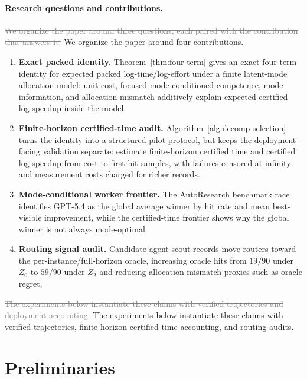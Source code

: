 \documentclass{article}
\newcommand{\oldtext}[1]{\textcolor{gray}{\sout{#1}}}
\newcommand{\newtext}[1]{\textcolor{green!50!black}{#1}}
\begin{document}
\paragraph{Research questions and contributions.}
\oldtext{We organize the paper around three questions, each paired with the contribution that answers it.}
\newtext{We organize the paper around four contributions.}

\begin{enumerate}[leftmargin=1.4em,itemsep=0.15em]
\item \newtext{\textbf{Exact packed identity.}
Theorem~\ref{thm:four-term} gives an exact four-term identity for expected packed log-time/log-effort under a finite latent-mode allocation model: unit cost, focused mode-conditioned competence, mode information, and allocation mismatch additively explain expected certified log-speedup inside the model.}
\item \newtext{\textbf{Finite-horizon certified-time audit.}
Algorithm~\ref{alg:decomp-selection} turns the identity into a structured pilot protocol, but keeps the deployment-facing validation separate: estimate finite-horizon certified time and certified log-speedup from cost-to-first-hit samples, with failures censored at infinity and measurement costs charged for richer records.}
\item \newtext{\textbf{Mode-conditional worker frontier.}
The AutoResearch benchmark race identifies GPT-5.4 as the global average winner by hit rate and mean best-visible improvement, while the certified-time frontier shows why the global winner is not always mode-optimal.}
\item \newtext{\textbf{Routing signal audit.}
Candidate-agent scout records move routers toward the per-instance/full-horizon oracle, increasing oracle hits from \(19/90\) under \(Z_0\) to \(59/90\) under \(Z_2\) and reducing allocation-mismatch proxies such as oracle regret.}
\end{enumerate}

\oldtext{The experiments below instantiate these claims with verified trajectories and deployment accounting.}
\newtext{The experiments below instantiate these claims with verified trajectories, finite-horizon certified-time accounting, and routing audits.}

\section{Preliminaries}
\label{sec:framework}
\end{document}
